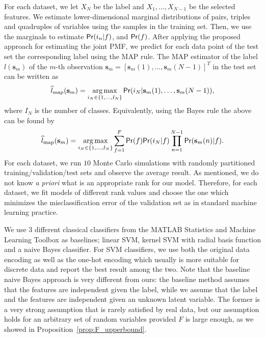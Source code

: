 \documentclass[journal]{IEEEtran}
\DeclareMathOperator*{\argmax}{arg\,max}
\begin{document}
For each dataset, we let $X_N$ be the label and $X_1,\ldots,X_{N-1}$ be the selected features. We estimate  {lower-dimensional} marginal distributions of pairs, triples and quadruples of variables using the samples in the training set. Then, we use the marginals to estimate ${\sf Pr}(i_n|f)$, and ${\sf Pr}(f)$.
After applying the proposed approach for estimating the joint PMF, we predict for each data point of the test set the corresponding label using the MAP rule. The MAP estimator of the label $l(\mathbf{s}_m)$ of the $m$-th observation $\mathbf{s}_m = [\mathbf{s}_m(1),\ldots,\mathbf{s}_m(N-1)]^T$ in the test set can be written as
\[
\widehat{l}_{\textrm{map}}(\mathbf{s}_m) = \argmax_{ i_N \in \{1,\ldots,I_N \} } {\sf Pr}( i_N | \mathbf{s}_m(1),\ldots,\mathbf{s}_m(N-1)),\]
where $I_N$ is the number of classes. Equivalently, using the Bayes rule the above can be found by
\[
\widehat{l}_{\textrm{map}}(\mathbf{s}_m) = \argmax_{ i_N \in \{1,\ldots,I_N \} } \sum_{f=1}^F {\sf Pr}(f) {\sf Pr}(i_N | f) \prod_{n=1}^{N-1} {\sf Pr}(\mathbf{s}_m(n)| f).
\]
For each dataset, we run $10$ Monte Carlo simulations {with randomly partitioned training/validation/test sets} and observe the average result. 
As mentioned, we do not know {\it a priori} what is an appropriate rank for our model. Therefore, for each dataset, we fit models of different rank values and choose the one which minimizes the misclassification error of the validation set as in standard machine learning practice.

We use $3$ different classical classifiers from the MATLAB Statistics and Machine Learning Toolbox  as baselines; linear SVM, kernel SVM with radial basis function and a naive Bayes classifier. For SVM classifiers, we use both the original data encoding as well as the one-hot encoding which usually is more suitable for discrete data and report the best result among the two.
Note that the baseline naive Bayes approach is very different from ours: the baseline method assumes that the features are independent given the label, while we assume that the label and the features are independent given an unknown latent variable.
The former is a very strong assumption that is rarely satisfied by real data, but our assumption holds for an arbitrary set of random variables provided $F$ is large enough, as we showed in Proposition~\ref{prop:F_upperbound}.
\end{document}
